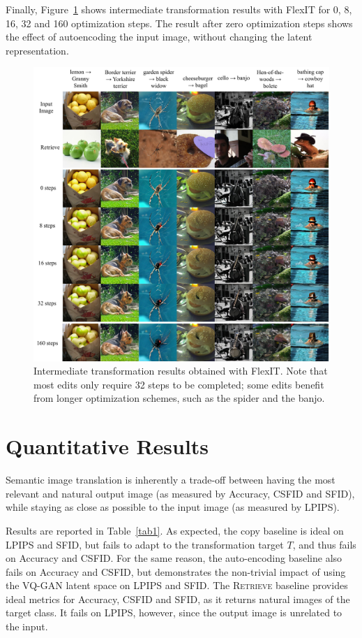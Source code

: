 Finally, Figure~\ref{fig:steps} shows intermediate transformation results with FlexIT for 0, 8, 16, 32 and 160 optimization steps. 
The result after zero optimization steps shows the effect of autoencoding the input image, without changing the latent representation.

\begin{figure}[t!]
    \center
    \includegraphics[width=\linewidth]{images/flexit/assets/steps.pdf}
    \caption{Intermediate transformation results obtained with FlexIT. Note that most edits only require 32 steps to be completed; some edits benefit from longer optimization schemes, such as the  spider and the banjo.
    }
    \label{fig:steps}
\end{figure}

\section{Quantitative Results}

Semantic image translation is inherently a trade-off between having the most relevant 
and natural output image (as measured by Accuracy, \ac{CSFID} and \ac{SFID}), while staying as 
close as possible to the input image (as measured by \ac{LPIPS}). 

Results are reported in Table~\ref{tab1}. 
As expected, the copy baseline is ideal on \ac{LPIPS} and \ac{SFID}, but fails to adapt to the 
transformation target $T$, and thus fails on Accuracy and \ac{CSFID}.
For the same reason, the auto-encoding baseline also fails on Accuracy and \ac{CSFID}, but 
demonstrates the non-trivial impact of using the VQ-GAN latent space on \ac{LPIPS} and \ac{SFID}. 
The \textsc{Retrieve} baseline provides ideal metrics for Accuracy, \ac{CSFID} and \ac{SFID}, as 
it returns natural images of the target class. 
It fails  on \ac{LPIPS}, however, since the output image is unrelated to the input. 


